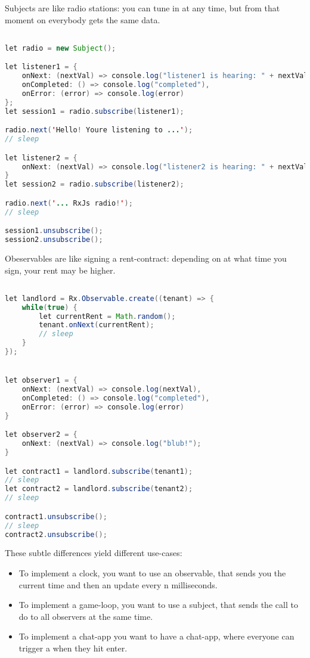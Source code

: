 Subjects are like radio stations: you can tune in at any time, but from that moment on everybody gets the same data.
\begin{lstlisting}[language=java]

let radio = new Subject();

let listener1 = {
    onNext: (nextVal) => console.log("listener1 is hearing: " + nextVal),
    onCompleted: () => console.log("completed"),
    onError: (error) => console.log(error)
};
let session1 = radio.subscribe(listener1);

radio.next('Hello! Youre listening to ...');
// sleep

let listener2 = {
    onNext: (nextVal) => console.log("listener2 is hearing: " + nextVal);
}
let session2 = radio.subscribe(listener2);

radio.next('... RxJs radio!');
// sleep

session1.unsubscribe();
session2.unsubscribe();

\end{lstlisting}

Obeservables are like signing a rent-contract: depending on at what time you sign, your rent may be higher. 
\begin{lstlisting}[language=java]

let landlord = Rx.Observable.create((tenant) => {
    while(true) {
        let currentRent = Math.random();
        tenant.onNext(currentRent);
        // sleep
    }
});


let observer1 = {
    onNext: (nextVal) => console.log(nextVal),
    onCompleted: () => console.log("completed"),
    onError: (error) => console.log(error)
}

let observer2 = {
    onNext: (nextVal) => console.log("blub!");
}

let contract1 = landlord.subscribe(tenant1);
// sleep
let contract2 = landlord.subscribe(tenant2);
// sleep

contract1.unsubscribe();
// sleep
contract2.unsubscribe();

\end{lstlisting}

These subtle differences yield different use-cases: 
\begin{itemize}
    \item To implement a clock, you want to use an observable, that sends you the current time and then an update every n milliseconds. 
    \item To implement a game-loop, you want to use a subject, that sends the call to do  to all observers at the same time. 
    \item To implement a chat-app you want to have a chat-app, where everyone can trigger a  when they hit enter. 
\end{itemize}